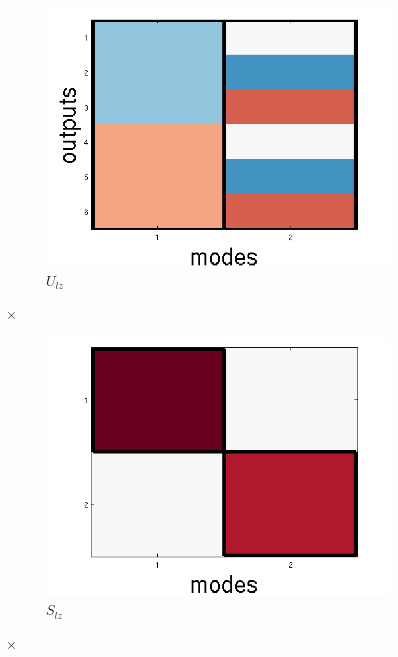 \documentclass[10pt,letterpaper]{article}
\begin{document}
\begin{figure}
\centering
\begin{subfigure}{0.22\textwidth}
\includegraphics[width=\textwidth]{figures/U_lz.png}
\caption{$U_{lz}$}
\end{subfigure}
\LARGE{$\times$}
\begin{subfigure}{0.22\textwidth}
\includegraphics[width=\textwidth]{figures/S_lz.png}
\caption{$S_{lz}$}
\end{subfigure}
\LARGE{$\times$}
\begin{subfigure}{0.22\textwidth}

\end{subfigure}
\end{figure}
\end{document}
